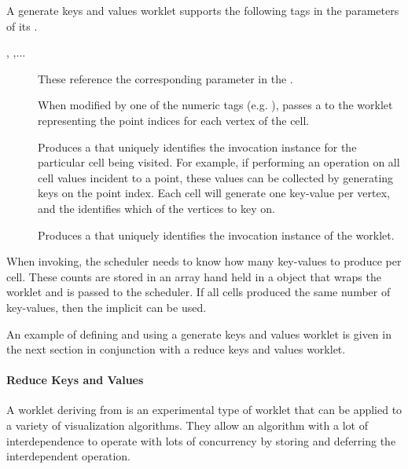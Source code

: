 A generate keys and values worklet supports the following tags in the
parameters of its \executionsignature.
\begin{description}
\item[, ,$\ldots$] These reference the
  corresponding parameter in the \controlsignature.
\item[] When modified by one of the numeric tags
  (e.g. ), passes a  to the
  worklet representing the point indices for each vertex of the cell.
\item[] Produces a  that uniquely identifies the
  invocation instance for the particular cell being visited. For example,
  if performing an operation on all cell values incident to a point, these
  values can be collected by generating keys on the point index. Each cell
  will generate one key-value per vertex, and the 
  identifies which of the vertices to key on.
\item[] Produces a  that uniquely identifies the
  invocation instance of the worklet.
\end{description}

When invoking, the scheduler needs to know how many key-values to produce
per cell. These counts are stored in an array hand held in a
 object that wraps the worklet and is passed to
the scheduler.  If all cells produced the
same number of key-values, then the implicit 
can be used.

An example of defining and using a generate keys and values worklet is
given in the next section in conjunction with a reduce keys and values
worklet.


\paragraph{Reduce Keys and Values}


A worklet deriving from  is an
experimental type of worklet that can be applied to a variety of
visualization algorithms. They allow an algorithm with a lot of
interdependence to operate with lots of concurrency by storing and
deferring the interdependent operation.

